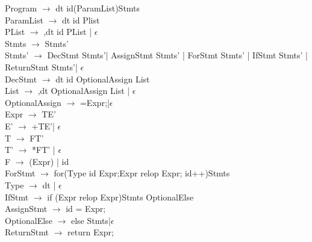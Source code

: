 \documentclass[12pt]{article}
\begin{document}
Program $\rightarrow$ dt id(ParamList){Stmts}\\
ParamList $\rightarrow$ dt id Plist\\
PList $\rightarrow$ ,dt id PList | $\epsilon$\\
Stmts $\rightarrow$ Stmts'\\
Stmts' $\rightarrow$ DecStmt Stmts'| AssignStmt Stmts' | ForStmt Stmts' | IfStmt Stmts' | ReturnStmt Stmts'| $\epsilon$\\
DecStmt $\rightarrow$ dt id OptionalAssign List\\
List $\rightarrow$ ,dt OptionalAssign List | $\epsilon$\\
OptionalAssign $\rightarrow$ =Expr;|$\epsilon$\\
Expr $\rightarrow$ TE'\\
E' $\rightarrow$ +TE'| $\epsilon$\\
T $\rightarrow$ FT'\\
T' $\rightarrow$ *FT' | $\epsilon$\\
F $\rightarrow$ (Expr) | id\\
ForStmt $\rightarrow$ for(Type id Expr;Expr relop Expr; id++){Stmts}\\
Type $\rightarrow$ dt | $\epsilon$\\
IfStmt $\rightarrow$ if (Expr relop Expr){Stmts} OptionalElse\\
AssignStmt $\rightarrow$ id = Expr;\\
OptionalElse $\rightarrow$ else {Stmts}|$\epsilon$\\
ReturnStmt $\rightarrow$ return Expr;
\end{document}

